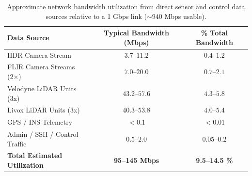 \documentclass{erauthesis}
\begin{document}
\begin{table}[htbp]
\centering
\begin{tabular}{lcc}
\hline
Data Source & Typical Bandwidth (Mbps) & \% Total Bandwidth \\
\hline
\hline
HDR Camera Stream & $3.7$--$11.2$ & $0.4$--$1.2$ \\
FLIR Camera Streams (2×) & $7.0$--$20.0$ & $0.7$--$2.1$ \\
Velodyne LiDAR Units (3x) & $43.2$--$57.6$ & $4.3$--$5.8$ \\
Livox LiDAR Units (3x) & $40.3$--$53.8$ & $4.0$--$5.4$ \\
GPS / INS Telemetry & $<0.1$ & $<0.01$ \\
Admin / SSH / Control Traffic & $0.5$--$2.0$ & $0.05$--$0.2$ \\
\hline
\textbf{Total Estimated Utilization} & \textbf{95--145 Mbps} & \textbf{9.5--14.5 \%} \\
\end{tabular}
\caption{Approximate network bandwidth utilization from direct sensor and control data sources relative to a 1 Gbps link ($\sim940$ Mbps usable).}
\label{table:network_bandwidth}
\end{table}









\end{document}
